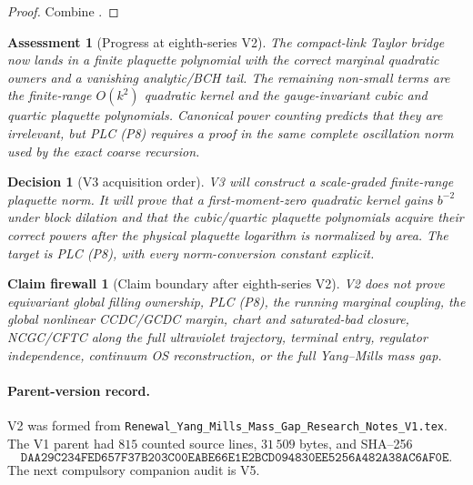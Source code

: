 \documentclass[11pt,oneside]{book}
\newtheorem{assessment}[theorem]{Assessment}
\newtheorem{firewall}[theorem]{Claim firewall}
\newtheorem{decision}[theorem]{Decision}
\theoremstyle{definition}
\theoremstyle{remark}
\begin{document}
\begin{proof}
Combine
.
\end{proof}

\begin{assessment}[Progress at eighth-series V2]
\label{ass:e8v2-status}
The compact-link Taylor bridge now lands in a finite plaquette
polynomial with the correct marginal quadratic owners and a vanishing
analytic/BCH tail.  The remaining non-small terms are the
finite-range \(O(k^2)\) quadratic kernel and the gauge-invariant cubic
and quartic plaquette polynomials.  Canonical power counting predicts
that they are irrelevant, but PLC (P8) requires a proof in the same
complete oscillation norm used by the exact coarse recursion.
\end{assessment}

\begin{decision}[V3 acquisition order]
\label{dec:e8v2-V3}
V3 will construct a scale-graded finite-range plaquette norm.  It will
prove that a first-moment-zero quadratic kernel gains \(b^{-2}\) under
block dilation and that the cubic/quartic plaquette polynomials acquire
their correct powers after the physical plaquette logarithm is
normalized by area.  The target is PLC (P8), with every norm-conversion
constant explicit.
\end{decision}

\begin{firewall}[Claim boundary after eighth-series V2]
\label{fire:e8v2-claim}
V2 does not prove equivariant global filling ownership, PLC (P8), the
running marginal coupling, the global nonlinear CCDC/GCDC margin,
chart and saturated-bad closure, NCGC/CFTC along the full ultraviolet
trajectory, terminal entry, regulator independence, continuum OS
reconstruction, or the full Yang--Mills mass gap.
\end{firewall}

\paragraph{Parent-version record.}
V2 was formed from
\texttt{Renewal\_Yang\_Mills\_Mass\_Gap\_Research\_Notes\_V1.tex}.
The V1 parent had \(815\) counted source lines,
\(31\,509\) bytes, and SHA--256
\[
 \texttt{DAA29C234FED657F37B203C00EABE66E1E2BCD094830EE5256A482A38AC6AF0E}.
\]
The next compulsory companion audit is V5.

\end{document}
